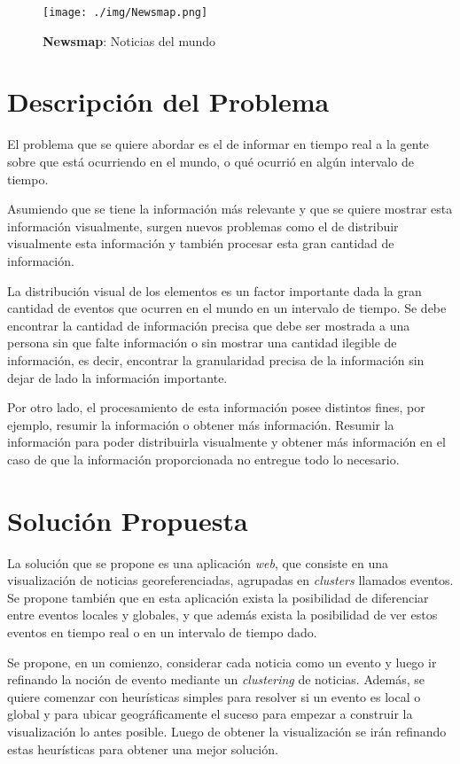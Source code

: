 \documentclass[10pt]{article}
\begin{document}
\begin{figure}[h!]
	\centering
    \texttt{[image: ./img/Newsmap.png]}
	\caption{\textbf{Newsmap}: Noticias del mundo}
	\label{newsmap}
\end{figure}

\section{Descripción del Problema}
El problema que se quiere abordar es el de informar en tiempo real a la gente sobre que está ocurriendo en el mundo, o qué ocurrió en algún intervalo de tiempo.

Asumiendo que se tiene la información más relevante y que se quiere mostrar esta información visualmente, surgen nuevos problemas como el de distribuir visualmente esta información y también procesar esta gran cantidad de información. 

La distribución visual de los elementos es un factor importante dada la gran cantidad de eventos que ocurren en el mundo en un intervalo de tiempo. Se debe encontrar la cantidad de información precisa que debe ser mostrada a una persona sin que falte información o sin mostrar una cantidad ilegible de información, es decir, encontrar la granularidad precisa de la información sin dejar de lado la información importante.

Por otro lado, el procesamiento de esta información posee distintos fines, por ejemplo, resumir la información o obtener más información. Resumir la información para poder distribuirla visualmente y obtener más información en el caso de que la información proporcionada no entregue todo lo necesario.

\section{Solución Propuesta}

La solución que se propone es una aplicación \emph{web}, que consiste en una visualización de noticias georeferenciadas, agrupadas en \emph{clusters} llamados eventos. Se propone también que en esta aplicación exista la posibilidad de diferenciar entre eventos locales y globales, y que además exista la posibilidad de ver estos eventos en tiempo real o en un intervalo de tiempo dado.

Se propone, en un comienzo, considerar cada noticia como un evento y luego ir refinando la noción de evento mediante un \emph{clustering} de noticias. Además, se quiere comenzar con heurísticas simples para resolver si un evento es local o global y para ubicar geográficamente el suceso para empezar a construir la visualización lo antes posible. Luego de obtener la visualización se irán refinando estas heurísticas para obtener una mejor solución.
\end{document}

